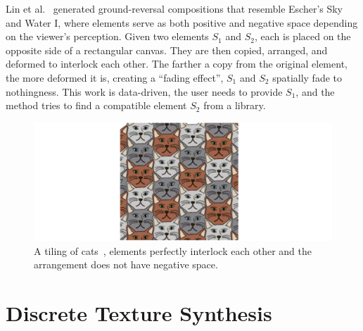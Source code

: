 \newtext
{
Lin et al.~\cite{Lin2018} generated ground-reversal compositions that resemble Escher's Sky and Water I,
where elements serve as both positive and negative space depending on the viewer's perception.
Given two elements $S_1$ and $S_2$, each is placed on the opposite side of a rectangular canvas.
They are then copied, arranged, and deformed to interlock each other.
The farther a copy from the original element, the more deformed it is, 
creating a ``fading effect'', $S_1$ and $S_2$ spatially fade to nothingness.
This work is data-driven, the user needs to provide $S_1$, 
and the method tries to find a compatible element $S_2$ from a library.
}



\begin{figure}[t]
\centering
\includegraphics[width=1.0\textwidth]{figures/related/escherization.pdf} 
\caption[A tiling of cats]
{\label{fig_related_escherization} 
\newtext
{
A tiling of cats~\cite{Kaplan2000}, elements perfectly interlock each other and the arrangement does not have negative space. 
}
}
\end{figure}

\section{Discrete Texture Synthesis}

